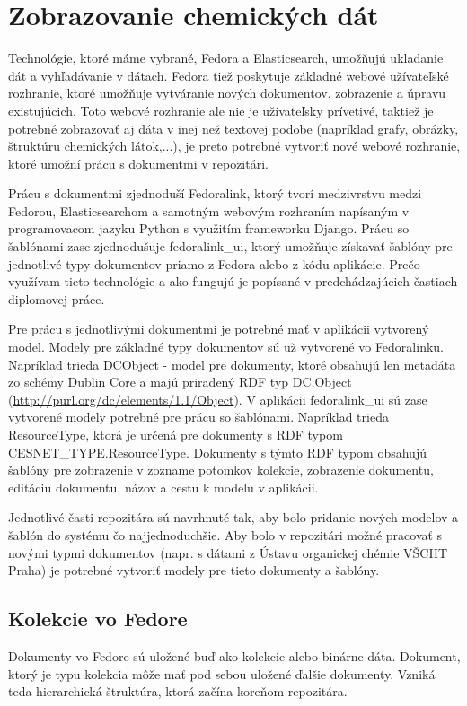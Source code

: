 \documentclass[thesis=M,slovak]{FITthesis}[2013/05/06]
\begin{document}
\section{Zobrazovanie chemických dát}
Technológie, ktoré máme vybrané, Fedora a Elasticsearch, umožňujú ukladanie dát a vyhľadávanie v dátach. Fedora tiež poskytuje základné webové užívateľské rozhranie, ktoré umožňuje vytváranie nových dokumentov, zobrazenie a úpravu existujúcich. Toto webové rozhranie ale nie je užívateľsky prívetivé, taktiež je potrebné zobrazovať aj dáta v inej než textovej podobe (napríklad grafy, obrázky, štruktúru chemických látok,...), je preto potrebné vytvoriť nové webové rozhranie, ktoré umožní prácu s dokumentmi v repozitári.

Prácu s dokumentmi zjednoduší Fedoralink, ktorý tvorí medzivrstvu medzi Fedorou, Elasticsearchom a samotným webovým rozhraním napísaným v programovacom jazyku Python s využitím frameworku Django. Prácu so šablónami zase zjednodušuje fedoralink\_ui, ktorý umožňuje získavať šablóny pre jednotlivé typy dokumentov priamo z Fedora alebo z kódu aplikácie. Prečo využívam tieto technológie a ako fungujú je popísané v predchádzajúcich častiach diplomovej práce.

Pre prácu s jednotlivými dokumentmi je potrebné mať v aplikácii vytvorený model. Modely pre základné typy dokumentov sú už vytvorené vo Fedoralinku. Napríklad trieda DCObject - model pre dokumenty, ktoré obsahujú len metadáta zo schémy Dublin Core a majú priradený RDF typ DC.Object (\url{http://purl.org/dc/elements/1.1/Object}). V aplikácii fedoralink\_ui sú zase vytvorené modely potrebné pre prácu so šablónami. Napríklad trieda ResourceType, ktorá je určená pre dokumenty s RDF typom CESNET\_TYPE.ResourceType. Dokumenty s týmto RDF typom obsahujú šablóny pre zobrazenie v zozname potomkov kolekcie, zobrazenie dokumentu, editáciu dokumentu, názov a cestu k modelu v aplikácii.

Jednotlivé časti repozitára sú navrhnuté tak, aby bolo pridanie nových modelov a šablón do systému čo najjednoduchšie. Aby bolo v repozitári možné pracovať s novými typmi dokumentov (napr. s dátami z Ústavu organickej chémie VŠCHT Praha) je potrebné vytvoriť modely pre tieto dokumenty a šablóny.

\subsection{Kolekcie vo Fedore}
Dokumenty vo Fedore sú uložené buď ako kolekcie alebo binárne dáta. Dokument, ktorý je typu kolekcia môže mať pod sebou uložené ďalšie dokumenty. Vzniká teda hierarchická štruktúra, ktorá začína koreňom repozitára.
\end{document}
